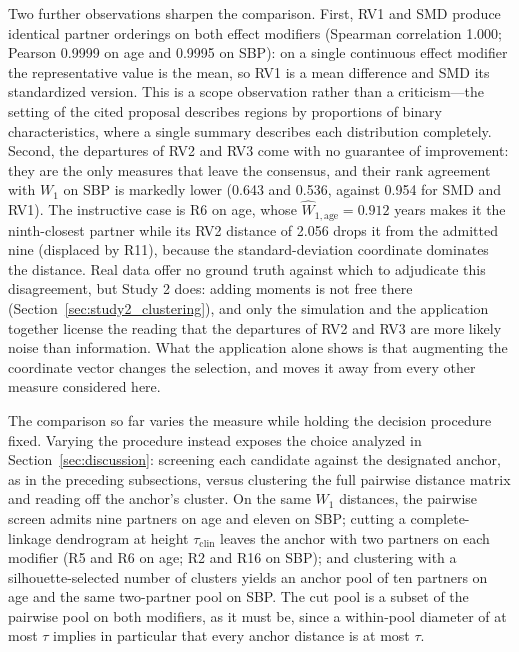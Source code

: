 \documentclass[AMA,Times1COL]{WileyNJDv5}
\begin{document}
Two further observations sharpen the comparison. First, RV1 and SMD produce identical partner orderings on both effect modifiers (Spearman correlation 1.000; Pearson 0.9999 on age and 0.9995 on SBP): on a single continuous effect modifier the representative value is the mean, so RV1 is a mean difference and SMD its standardized version. This is a scope observation rather than a criticism---the setting of the cited proposal describes regions by proportions of binary characteristics, where a single summary describes each distribution completely.\cite{komiyama2024} Second, the departures of RV2 and RV3 come with no guarantee of improvement: they are the only measures that leave the consensus, and their rank agreement with $W_1$ on SBP is markedly lower (0.643 and 0.536, against 0.954 for SMD and RV1). The instructive case is R6 on age, whose $\widehat{W}_{1,\text{age}} = 0.912$ years makes it the ninth-closest partner while its RV2 distance of 2.056 drops it from the admitted nine (displaced by R11), because the standard-deviation coordinate dominates the distance. Real data offer no ground truth against which to adjudicate this disagreement, but Study 2 does: adding moments is not free there (Section~\ref{sec:study2_clustering}), and only the simulation and the application together license the reading that the departures of RV2 and RV3 are more likely noise than information. What the application alone shows is that augmenting the coordinate vector changes the selection, and moves it away from every other measure considered here.

The comparison so far varies the measure while holding the decision procedure fixed. Varying the procedure instead exposes the choice analyzed in Section~\ref{sec:discussion}: screening each candidate against the designated anchor, as in the preceding subsections, versus clustering the full pairwise distance matrix and reading off the anchor's cluster. On the same $W_1$ distances, the pairwise screen admits nine partners on age and eleven on SBP; cutting a complete-linkage dendrogram at height $\tau_{\text{clin}}$ leaves the anchor with two partners on each modifier (R5 and R6 on age; R2 and R16 on SBP); and clustering with a silhouette-selected number of clusters yields an anchor pool of ten partners on age and the same two-partner pool on SBP. The cut pool is a subset of the pairwise pool on both modifiers, as it must be, since a within-pool diameter of at most $\tau$ implies in particular that every anchor distance is at most $\tau$.
\end{document}
